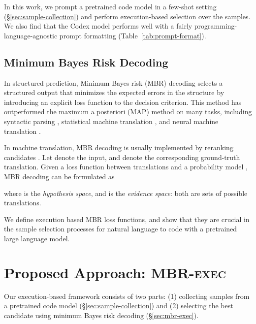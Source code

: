 \documentclass[11pt]{article}
\newcommand{\interalia}[1]{\citep[\textit{inter alia}]{#1}}
\newcommand{\mbrexec}{\textsc{MBR-exec}\xspace}
\begin{document}
In this work, we prompt a pretrained code model \citep[Codex;][]{chen2021evaluating} in a few-shot setting (\S\ref{sec:sample-collection}) and perform execution-based selection over the samples. We also find that the Codex model performs well with a fairly programming-language-agnostic prompt formatting (Table~\ref{tab:prompt-format}). 

\subsection{Minimum Bayes Risk Decoding}
In structured prediction, Minimum Bayes risk (MBR) decoding \citep{bickel1977mathematical} selects a structured output that minimizes the expected errors in the structure by introducing an explicit loss function to the decision criterion. This method has outperformed the maximum a posteriori (MAP) method on many tasks, including syntactic parsing \citep{titov2006bayes,shi-etal-2019-visually,zhang-etal-2020-efficient}, statistical machine translation \citep{kumar-byrne-2004-minimum,zhang-gildea-2008-efficient}, and neural machine translation \citep{eikema-aziz-2020-map,eikema2021sampling}. 

In machine translation, MBR decoding is usually implemented by reranking candidates \interalia{goel-byrne-2000-minimum, kumar-byrne-2004-minimum, tromble-etal-2008-lattice}. Let  denote the input, and  denote the corresponding ground-truth translation. Given a loss function  between translations and a probability model , MBR decoding can be formulated as 

where  is the \textit{hypothesis space}, and  is the \textit{evidence space}: both are sets of possible translations. 

We define execution based MBR loss functions, and show that they are crucial in the sample selection processes for natural language to code with a pretrained large language model. 
 
\section{Proposed Approach: \mbrexec}
Our execution-based framework consists of two parts: (1) collecting samples from a pretrained code model (\S\ref{sec:sample-collection}) and (2) selecting the best candidate using minimum Bayes risk decoding (\S\ref{sec:mbr-exec}).
\end{document}
